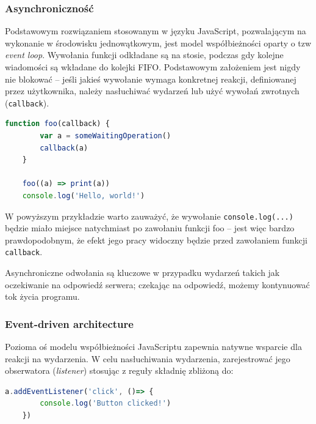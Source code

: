 \subsubsection{Asynchroniczność}
Podstawowym rozwiązaniem stosowanym w języku JavaScript, pozwalającym na wykonanie w środowisku jednowątkowym, jest model współbieżności oparty o tzw {\em event loop}. Wywołania funkcji odkładane są na stosie, podczas gdy kolejne wiadomości są wkładane do kolejki FIFO. Podstawowym założeniem jest nigdy nie blokować -- jeśli jakieś wywołanie wymaga konkretnej reakcji, definiowanej przez użytkownika, należy nasłuchiwać wydarzeń lub użyć wywołań zwrotnych (\texttt{callback}).

\begin{lstlisting}[language=javascript]
    function foo(callback) {
        var a = someWaitingOperation()
        callback(a)
    }

    foo((a) => print(a))
    console.log('Hello, world!')
\end{lstlisting}

W powyższym przykładzie warto zauważyć, że wywołanie \texttt{console.log(...)} będzie miało miejsce natychmiast po zawołaniu funkcji foo -- jest więc bardzo prawdopodobnym, że efekt jego pracy widoczny będzie przed zawołaniem funkcji \texttt{callback}.

Asynchroniczne odwołania są kluczowe w przypadku wydarzeń takich jak oczekiwanie na odpowiedź serwera; czekając na odpowiedź, możemy kontynuować tok życia programu.

\subsubsection{Event-driven architecture}
Pozioma oś modelu współbieżności JavaScriptu zapewnia natywne wsparcie dla reakcji na wydarzenia. W celu nasłuchiwania wydarzenia, zarejestrować jego obserwatora ({\em listener}) stosując z reguły składnię zbliżoną do:
\begin{lstlisting}[language=javascript]
    a.addEventListener('click', ()=> {
        console.log('Button clicked!')
    })
\end{lstlisting}

